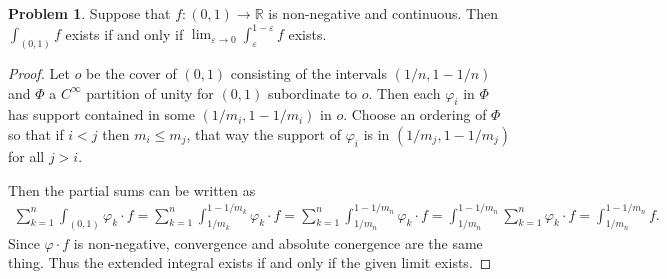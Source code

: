 \documentclass[20pt]{article}
\theoremstyle{plain}
\theoremstyle{definition}
\newtheorem*{problem}{Problem}
\newcommand{\reals}{\mathbb{R}}
\begin{document}
\begin{problem}{3.37}
  Suppose that $f: (0, 1) \to \reals$ is non-negative and continuous.
  Then $\int_{(0,1)}f$ exists if and only if 
  $\lim_{\varepsilon \to 0} \int_\varepsilon^{1-\varepsilon}f$ exists.
\end{problem}

\begin{proof}
  Let $o$ be the cover of $(0, 1)$ consisting of the intervals
  $(1/n, 1 - 1/n)$ and $\Phi$ a $C^\infty$ partition of unity for $(0, 1)$
  subordinate to $o$.
  Then each $\varphi_i$ in $\Phi$ has support contained in some 
  $(1/m_i, 1 - 1/m_i)$ in $o$.
  Choose an ordering of $\Phi$ so that if $i < j$ then $m_i \leq m_j$, that way
  the support of $\varphi_i$ is in $ (1 / m_j, 1 - 1/m_j) $ for all $j > i.$

  Then the partial sums can be written as
  \begin{align*}
    \sum_{k=1}^n \int_{(0, 1)} \varphi_k \cdot f = 
    \sum_{k=1}^n \int_{1/m_k}^{1 - 1/m_k} \varphi_k \cdot f = 
    \sum_{k=1}^n \int_{1/m_n}^{1 - 1/m_n} \varphi_k \cdot f =  
    \int_{1/m_n}^{1 - 1/m_n} \sum_{k=1}^n  \varphi_k \cdot f =  
    \int_{1/m_n}^{1 - 1/m_n} f.
  \end{align*}
  Since $\varphi \cdot f$ is non-negative, convergence and absolute conergence
  are the same thing. Thus the extended integral exists if and only if the 
  given limit exists.
\end{proof}
\end{document}

